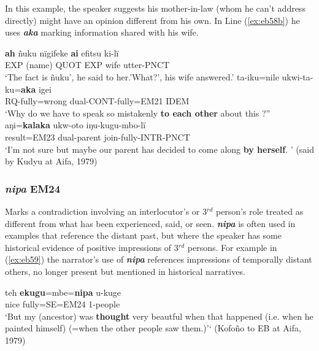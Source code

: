 \documentclass[output=paper]{langsci/langscibook}
\begin{document}
In this example,  the speaker suggests his mother-in-law (whom he can’t address directly)  might have an opinion different from his own.  In Line (\ref{ex:eb58b}) he uses \textbf{\textit{aka}} marking information shared with his wife. 

\begin{exe}
\ex \label{ex:eb58}
	\begin{xlist}
	\ex \label{ex:eb58a}
	\gll \textbf{ah} ñuku nïgifeke \textbf{ai} efitsu ki-lï\\
	EXP (name) QUOT EXP wife utter-PNCT\\
	\trans ‘The fact is ñuku’, he said to her.’What?’, his wife answered.’
	\ex \label{ex:eb58b}
	\gll ta-iku=nile ukwi-ta-ku=\textbf{aka} igei\\
	RQ-fully=wrong dual-CONT-fully=EM21 IDEM\\
	\trans ‘Why do we have to speak so mistakenly \textbf{to each other} about this ?”
	\ex \label{ex:eb58c}
	\gll aŋi=\textbf{kalaka} ukw-oto iŋu-kugu-mbo-lï\\
	result=EM23 dual-parent join-fully-INTR-PNCT\\
	\trans ‘I’m not sure but maybe our parent has decided to come along \textbf{by herself}. ’ (said by Kudyu at Aifa, 1979)  
\end{xlist}
\end{exe}

\subsubsection{\textit{nipa} EM24}  
Marks a contradiction  involving an interlocutor’s or 3$^{rd}$ person’s role treated as different from what has been experienced, said, or seen. \textbf{\textit{nipa}}  is often used in examples that reference the distant past,  but where the speaker has some historical evidence of positive impressions of 3$^{rd}$ persons.  For example in (\ref{ex:eb59}) the narrator’s  use of \textbf{\textit{nipa}} references impressions of temporally distant others, no longer present but mentioned in historical narratives. 

\begin{exe}
	\ex \label{ex:eb59}
	\gll teh \textbf{ekugu}=mbe=\textbf{nipa} u-kuge\\
	nice fully=SE=EM24 1-people\\
	\trans ‘But my (ancestor)  was  \textbf{thought} very beautful when that happened (i.e. when he painted himself) (=when the other people saw them.)’‘ (Kofoño to EB at Aifa, 1979)	
\end{exe}
\end{document}
